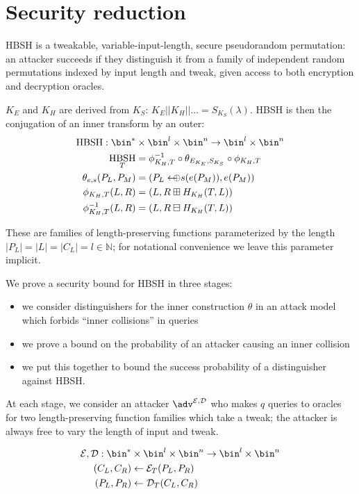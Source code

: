 \documentclass[journal=tosc,preprint,floatrow,submission]{iacrtrans}
\DeclareMathOperator{\HBSH}{HBSH}
\newcommand*{\arrowoplus}{\leftarrow\mkern-12mu\oplus}
\newcommand*{\calE}{\mathcal{E}}
\newcommand*{\calD}{\mathcal{D}}
\begin{document}
\section{Security reduction}
HBSH is a tweakable, variable-input-length, secure pseudorandom permutation: an attacker
succeeds if they distinguish it from a family of independent random permutations indexed by
input length and tweak, given access to both encryption and decryption oracles.

$K_E$ and $K_H$ are derived from $K_S$:
$K_E || K_H || \ldots = S_{K_S}(\lambda)$. HBSH is then
the conjugation of an inner transform by an outer:
\begin{align*}
    \HBSH:
    \bin^* &\times \bin^l \times \bin^n \rightarrow \bin^l \times \bin^n \\
    \HBSH_{T} &= \phi^{-1}_{K_H, T}
    \circ \theta_{E_{K_E}, S_{K_S}} \circ \phi_{K_H, T} \\
    \theta_{e, s}(P_L, P_M) &= (P_L \arrowoplus s(e(P_M)), e(P_M)) \\
    \phi_{K_H, T}(L, R) &= (L, R \boxplus H_{K_H}(T, L)) \\
    \phi^{-1}_{K_H, T}(L, R) &= (L, R \boxminus H_{K_H}(T, L))
\end{align*}

These are families of length-preserving functions parameterized by the length
$|P_L| = |L| = |C_L| = l \in \mathbb{N}$;
for notational convenience we leave this parameter implicit.

We prove a security bound for HBSH in three stages:
\begin{itemize}
    \item we consider distinguishers for the inner construction $\theta$ in an
    attack model which forbids ``inner collisions'' in queries
    \item we prove a bound on the probability of an attacker causing an inner collision
    \item we put this together to bound the success probability of a distinguisher against
    HBSH.
\end{itemize}

At each stage, we consider an attacker \(\adv^{\calE, \calD}\) who makes $q$ queries
to oracles for
two length-preserving function families which take a tweak; the attacker is always free to vary
the length of input and tweak.

\begin{align*}
\calE, \calD:
\bin^* &\times \bin^l \times \bin^n \rightarrow \bin^l \times \bin^n \\
(C_L, C_R) &\leftarrow \calE_T(P_L, P_R) \\
(P_L, P_R) &\leftarrow \calD_T(C_L, C_R) \\
\end{align*}
\end{document}
